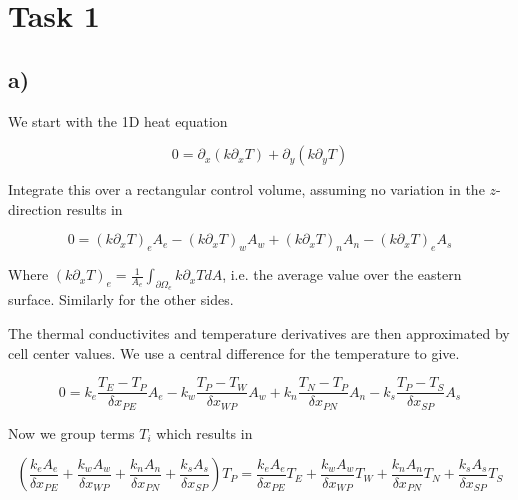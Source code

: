 \documentclass{article}
\begin{document}

\section{Task 1}

\subsection{a)}

We start with the 1D heat equation

\begin{equation}
0 = \partial_x (k \partial_x T) + \partial_y( k \partial_y  T)
\end{equation}

Integrate this over a rectangular control volume, assuming no variation in the $z$-direction results in

\begin{equation}
\label{eq:fvm}
0 = (k \partial_x T)_e A_e - (k \partial_x T)_w A_w + (k \partial_x T)_n A_n - (k \partial_x T)_e A_s
\end{equation}

Where $(k \partial_x T)_e = \frac{1}{A_e}\int_{\partial \Omega_e} k \partial_x T dA$, i.e. the average value over the eastern surface. Similarly for the other sides.

The thermal conductivites and temperature derivatives are then approximated by cell center values. We use a central difference for the temperature to give.

\begin{equation}
0=k_e \frac{T_E - T_P}{\delta x_{PE} } A_e - k_w \frac{T_P - T_W}{\delta x_{WP} } A_w + k_n \frac{T_N - T_P}{\delta x_{PN} } A_n - k_s \frac{T_P - T_S}{\delta x_{SP} } A_s
\end{equation}

Now we group terms $T_i$ which results in

\begin{equation}
\left( \frac{k_e A_e}{\delta x_{PE}} + \frac{k_w A_w}{\delta x_{WP}} + \frac{k_n A_n}{\delta x_{PN}}  + \frac{k_s A_s}{\delta x_{SP}} \right) T_P = \frac{k_e A_e}{\delta x_{PE}} T_E + \frac{k_w A_w}{\delta x_{WP}} T_W + \frac{k_n A_n}{\delta x_{PN}} T_N + \frac{k_s A_s}{\delta x_{SP}} T_S
\end{equation}
\end{document}
